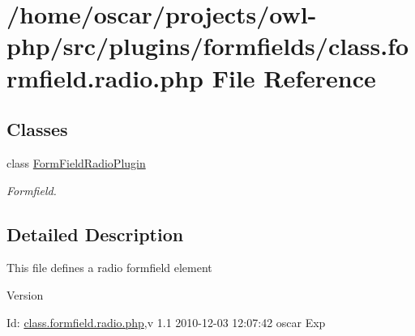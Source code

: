 \section{/home/oscar/projects/owl-\/php/src/plugins/formfields/class.formfield.radio.php File Reference}
\label{class_8formfield_8radio_8php}
\subsection*{Classes}
\begin{DoxyCompactItemize}
\item 
class \hyperlink{classFormFieldRadioPlugin}{FormFieldRadioPlugin}
\begin{DoxyCompactList}\small\item\em Formfield. \item\end{DoxyCompactList}\end{DoxyCompactItemize}


\subsection{Detailed Description}
This file defines a radio formfield element \begin{DoxyVersion}{Version}

\end{DoxyVersion}
\begin{DoxyParagraph}{Id:}
\hyperlink{class_8formfield_8radio_8php}{class.formfield.radio.php},v 1.1 2010-\/12-\/03 12:07:42 oscar Exp 
\end{DoxyParagraph}
